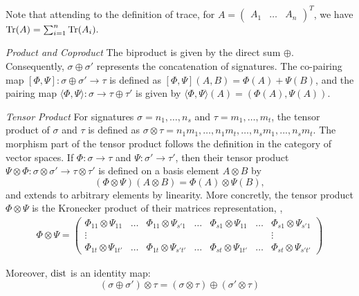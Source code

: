 Note that attending to the definition of trace, for $A = \begin{pmatrix} A_1 & \ldots & A_n \end{pmatrix}^T$, we have $\text{Tr}(A) = \sum_{i=1}^n \text{Tr}(A_i).$
 

\begin{definition} \label{def:biproduct} \emph{Product and Coproduct}
  The biproduct is given by the direct sum $\oplus$. Consequently, $\sigma \oplus \sigma'$ represents the concatenation of signatures. The co-pairing map $[\Phi, \Psi]: \sigma \oplus \sigma' \to \tau$ is defined as  $[\Phi, \Psi](A, B) = \Phi(A) + \Psi(B)$, and the pairing map $\langle \Phi, \Psi \rangle: \sigma \to \tau \oplus \tau'$ is given by  $\langle \Phi, \Psi \rangle(A) = (\Phi(A), \Psi(A))$.
\end{definition}

\begin{definition} \label{def:tensor} \emph{Tensor Product }
  For signatures $\sigma = n_1, \ldots, n_s $ and $\tau= m_1, \ldots, m_t $, the tensor product of $\sigma$ and $\tau$ is defined as $\sigma \otimes \tau = n_1 m_1, \ldots ,n_1 m_t, \ldots, n_s m_1,...,n_s m_t$. 
  The morphism part of the tensor product follows the definition in the category of vector spaces. If $\Phi: \sigma \rightarrow \tau$ and $\Psi: \sigma' \rightarrow  \tau'$, then their tensor product $\Psi \otimes \Phi: \sigma \otimes \sigma' \rightarrow  \tau \otimes \tau' $ is defined on a basis element $A \otimes B$ by  
$$
(\Phi \otimes \Psi)(A \otimes B) = \Phi(A) \otimes \Psi(B),
$$
and extends to arbitrary elements by linearity. More concretly, the tensor product $\Phi \otimes \Psi$ is the Kronecker product of their matrices representation, \ie,
\begin{align*}
  \Phi \otimes \Psi = 
  \begin{pmatrix}
  \Phi_{11} \otimes \Psi_{11} & \ldots & \Phi_{11} \otimes \Psi_{s'1} & \ldots   & \Phi_{s1} \otimes \Psi_{11} & \ldots & \Phi_{s1} \otimes \Psi_{s'1} \\
  \vdots & & & & & & \vdots \\
  \Phi_{1t} \otimes \Psi_{1t'} & \ldots & \Phi_{1t} \otimes \Psi_{s't'} & \ldots   & \Phi_{st} \otimes \Psi_{1t'} & \ldots & \Phi_{st} \otimes \Psi_{s't'}
\end{pmatrix}
\end{align*}



 Moreover, $\mathrm{dist}$ is an identity map:
  \[ (\sigma \oplus \sigma') \otimes \tau = (\sigma \otimes \tau ) \oplus (\sigma' \otimes \tau ) \]

  
\end{definition}



